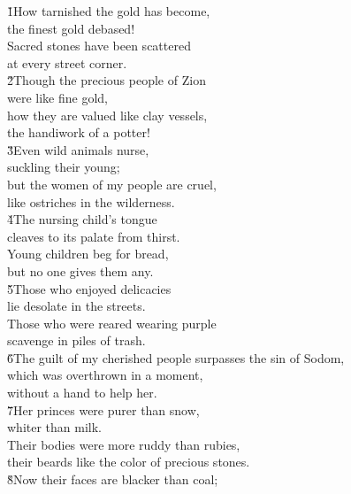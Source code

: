 \begin{poetry}
\poeml {}
\v{1}How tarnished the gold has become, \\
\poemll    the finest gold debased! \\
\poeml Sacred stones have been scattered \\
\poemll    at every street corner. \\
\poeml \v{2}Though the precious people of Zion \\
\poemll    were like fine gold, \\
\poeml how they are valued like clay vessels, \\
\poemll    the handiwork of a potter! \\
\poeml \v{3}Even wild animals nurse, \\
\poemll    suckling their young; \\
\poeml but the women of my people are cruel, \\
\poemll    like ostriches in the wilderness. \\
\poeml \v{4}The nursing child's tongue \\
\poemll    cleaves to its palate from thirst. \\
\poeml Young children beg for bread, \\
\poemll    but no one gives them any. \\
\poeml \v{5}Those who enjoyed delicacies \\
\poemll    lie desolate in the streets. \\
\poeml Those who were reared wearing purple \\
\poemll    scavenge in piles of trash. \\
\poeml \v{6}The guilt of my cherished people surpasses the sin of Sodom, \\
\poemll    which was overthrown in a moment, \\
\poemlll       without a hand to help her. \\
\poeml \v{7}Her princes were purer than snow, \\
\poemll    whiter than milk. \\
\poeml Their bodies were more ruddy than rubies, \\
\poemll    their beards like the color of precious stones. \\
\poeml \v{8}Now their faces are blacker than coal; \\

\end{poetry}
